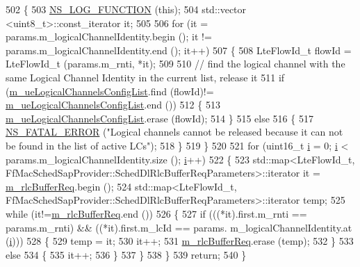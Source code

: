 \begin{DoxyCode}
502 \{
503   \hyperlink{log-macros-disabled_8h_a90b90d5bad1f39cb1b64923ea94c0761}{NS\_LOG\_FUNCTION} (\textcolor{keyword}{this});
504   std::vector <uint8\_t>::const\_iterator it;
505 
506   \textcolor{keywordflow}{for} (it = params.m\_logicalChannelIdentity.begin (); it != params.m\_logicalChannelIdentity.end (); it++)
507     \{
508       LteFlowId\_t flowId = LteFlowId\_t (params.m\_rnti, *it);
509 
510       \textcolor{comment}{// find the logical channel with the same Logical Channel Identity in the current list, release it}
511       \textcolor{keywordflow}{if} (\hyperlink{classns3_1_1CqaFfMacScheduler_a2e7fafcc959bf531979bc041782ac5b1}{m\_ueLogicalChannelsConfigList}.find (flowId)!= 
      \hyperlink{classns3_1_1CqaFfMacScheduler_a2e7fafcc959bf531979bc041782ac5b1}{m\_ueLogicalChannelsConfigList}.end ())
512         \{
513           \hyperlink{classns3_1_1CqaFfMacScheduler_a2e7fafcc959bf531979bc041782ac5b1}{m\_ueLogicalChannelsConfigList}.erase (flowId);
514         \}
515       \textcolor{keywordflow}{else}
516         \{
517           \hyperlink{group__fatal_ga5131d5e3f75d7d4cbfd706ac456fdc85}{NS\_FATAL\_ERROR} (\textcolor{stringliteral}{"Logical channels cannot be released because it can not be found in
       the list of active LCs"});
518         \}
519     \}
520         
521   \textcolor{keywordflow}{for} (uint16\_t \hyperlink{bernuolliDistribution_8m_a6f6ccfcf58b31cb6412107d9d5281426}{i} = 0; \hyperlink{bernuolliDistribution_8m_a6f6ccfcf58b31cb6412107d9d5281426}{i} < params.m\_logicalChannelIdentity.size (); \hyperlink{bernuolliDistribution_8m_a6f6ccfcf58b31cb6412107d9d5281426}{i}++)
522     \{
523       std::map<LteFlowId\_t, FfMacSchedSapProvider::SchedDlRlcBufferReqParameters>::iterator it = 
      \hyperlink{classns3_1_1CqaFfMacScheduler_ae9f6c7fc32e6dd08573470c70d827610}{m\_rlcBufferReq}.begin ();
524       std::map<LteFlowId\_t, FfMacSchedSapProvider::SchedDlRlcBufferReqParameters>::iterator temp;
525       \textcolor{keywordflow}{while} (it!=\hyperlink{classns3_1_1CqaFfMacScheduler_ae9f6c7fc32e6dd08573470c70d827610}{m\_rlcBufferReq}.end ())
526         \{
527           \textcolor{keywordflow}{if} (((*it).first.m\_rnti == params.m\_rnti) && ((*it).first.m\_lcId == params.
      m\_logicalChannelIdentity.at (\hyperlink{bernuolliDistribution_8m_a6f6ccfcf58b31cb6412107d9d5281426}{i})))
528             \{
529               temp = it;
530               it++;
531               \hyperlink{classns3_1_1CqaFfMacScheduler_ae9f6c7fc32e6dd08573470c70d827610}{m\_rlcBufferReq}.erase (temp);
532             \}
533           \textcolor{keywordflow}{else}
534             \{
535               it++;
536             \}
537         \}
538     \}
539   \textcolor{keywordflow}{return};
540 \}
\end{DoxyCode}


